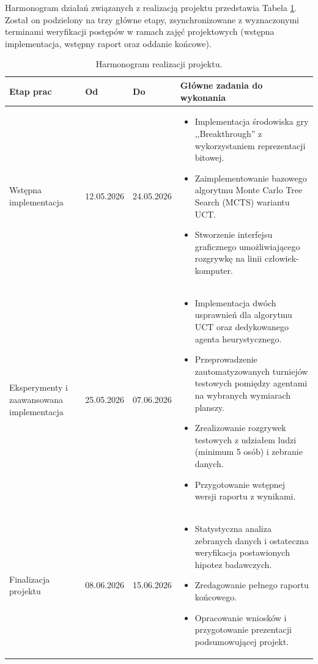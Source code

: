 \documentclass{article}
\begin{document}
Harmonogram działań związanych z realizacją projektu przedstawia Tabela \ref{tab:harmonogram_projektu}. Został on podzielony na trzy główne etapy, zsynchronizowane z wyznaczonymi terminami weryfikacji postępów w ramach zajęć projektowych (wstępna implementacja, wstępny raport oraz oddanie końcowe).

\begin{table}[H]
\centering
\renewcommand{\arraystretch}{1.3}
\begin{tabularx}{\textwidth}{|p{3cm}|p{2.2cm}|p{2.2cm}|X|}
\hline
\textbf{Etap prac} & \textbf{Od} & \textbf{Do} & \textbf{Główne zadania do wykonania} \\
\hline
Wstępna implementacja 
& 12.05.2026 
& 24.05.2026 
& \begin{itemize}[leftmargin=*, nosep]
    \item Implementacja środowiska gry ,,Breakthrough'' z wykorzystaniem reprezentacji bitowej.
    \item Zaimplementowanie bazowego algorytmu Monte Carlo Tree Search (MCTS) wariantu UCT.
    \item Stworzenie interfejsu graficznego umożliwiającego rozgrywkę na linii człowiek-komputer.
\end{itemize} \\
\hline
Eksperymenty i zaawansowana implementacja 
& 25.05.2026 
& 07.06.2026 
& \begin{itemize}[leftmargin=*, nosep]
    \item Implementacja dwóch usprawnień dla algorytmu UCT oraz dedykowanego agenta heurystycznego.
    \item Przeprowadzenie zautomatyzowanych turniejów testowych pomiędzy agentami na wybranych wymiarach planszy.
    \item Zrealizowanie rozgrywek testowych z udziałem ludzi (minimum 5 osób) i zebranie danych.
    \item Przygotowanie wstępnej wersji raportu z wynikami.
\end{itemize} \\
\hline
Finalizacja projektu 
& 08.06.2026 
& 15.06.2026 
& \begin{itemize}[leftmargin=*, nosep]
    \item Statystyczna analiza zebranych danych i ostateczna weryfikacja postawionych hipotez badawczych.
    \item Zredagowanie pełnego raportu końcowego.
    \item Opracowanie wniosków i przygotowanie prezentacji podsumowującej projekt.
\end{itemize} \\
\hline
\end{tabularx}
\caption{Harmonogram realizacji projektu.}
\label{tab:harmonogram_projektu}
\end{table}
\end{document}
